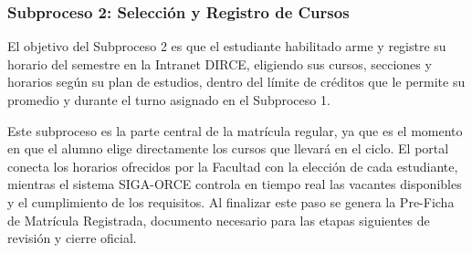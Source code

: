 \subsubsection{Subproceso 2: Selección y Registro de Cursos}

El objetivo del Subproceso 2 es que el estudiante habilitado arme y registre su horario del semestre en la Intranet DIRCE, eligiendo sus cursos, secciones y horarios según su plan de estudios, dentro del límite de créditos que le permite su promedio y durante el turno asignado en el Subproceso 1.

Este subproceso es la parte central de la matrícula regular, ya que es el momento en que el alumno elige directamente los cursos que llevará en el ciclo. El portal conecta los horarios ofrecidos por la Facultad con la elección de cada estudiante, mientras el sistema SIGA-ORCE controla en tiempo real las vacantes disponibles y el cumplimiento de los requisitos. Al finalizar este paso se genera la Pre-Ficha de Matrícula Registrada, documento necesario para las etapas siguientes de revisión y cierre oficial.
